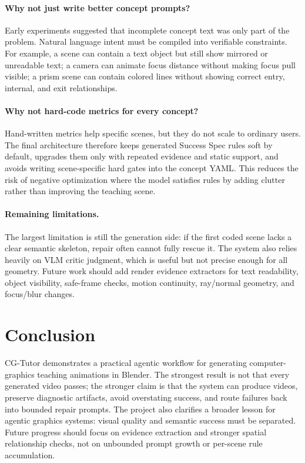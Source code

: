 \documentclass[10pt,letterpaper]{article}
\begin{document}
\paragraph{Why not just write better concept prompts?}
Early experiments suggested that incomplete concept text was only part of
the problem. Natural language intent must be compiled into verifiable
constraints. For example, a scene can contain a text object but still show
mirrored or unreadable text; a camera can animate focus distance without
making focus pull visible; a prism scene can contain colored lines without
showing correct entry, internal, and exit relationships.

\paragraph{Why not hard-code metrics for every concept?}
Hand-written metrics help specific scenes, but they do not scale to ordinary
users. The final architecture therefore keeps generated Success Spec rules
soft by default, upgrades them only with repeated evidence and static
support, and avoids writing scene-specific hard gates into the concept YAML.
This reduces the risk of negative optimization where the model satisfies
rules by adding clutter rather than improving the teaching scene.

\paragraph{Remaining limitations.}
The largest limitation is still the generation side: if the first coded
scene lacks a clear semantic skeleton, repair often cannot fully rescue it.
The system also relies heavily on VLM critic judgment, which is useful but
not precise enough for all geometry. Future work should add render evidence
extractors for text readability, object visibility, safe-frame checks,
motion continuity, ray/normal geometry, and focus/blur changes.

\section{Conclusion}

CG-Tutor demonstrates a practical agentic workflow for generating
computer-graphics teaching animations in Blender. The strongest result is
not that every generated video passes; the stronger claim is that the system
can produce videos, preserve diagnostic artifacts, avoid overstating
success, and route failures back into bounded repair prompts. The project
also clarifies a broader lesson for agentic graphics systems: visual quality
and semantic success must be separated. Future progress should focus on
evidence extraction and stronger spatial relationship checks, not on
unbounded prompt growth or per-scene rule accumulation.
\end{document}
